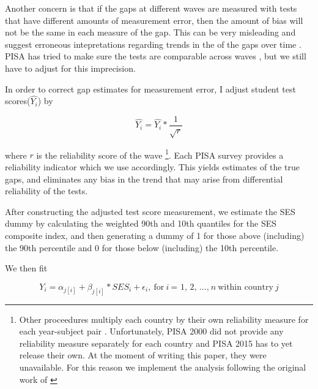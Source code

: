 \documentclass[11pt, a4paper]{article}\usepackage[]{graphicx}\usepackage[]{color}
\begin{document}
Another concern is that if the gaps at different waves are measured with tests that have different amounts of measurement error, then the amount of bias will not be the same in each measure of the gap. This can be very misleading and suggest erroneous intepretations regarding trends in the of the gaps over time \citep{reardon2011}. PISA has tried to make sure the tests are comparable across waves \citep{pisa2012_technical}, but we still have to adjust for this imprecision.

In order to correct gap estimates for measurement error, I adjust student test scores(\begin{math} \hat{Y_i} \end{math}) by

\begin{equation}
\hat{Y_i} = \hat{Y_i} * \frac{1}{\sqrt{r}}
\end{equation}

where \begin{math}r\end{math} is the reliability score of the wave \footnote{Other proceedures multiply each country by their own reliability measure for each year-subject pair \citep{anna2016_global}. Unfortunately, PISA 2000 did not provide any reliability measure separately for each country and PISA 2015 has to yet release their own. At the moment of writing this paper, they were unavailable. For this reason we implement the analysis following the original work of \citet{reardon2011}}. Each PISA survey provides a reliability indicator which we use accordingly. This yields estimates of the true gaps, and eliminates any bias in the trend that may arise from differential reliability of the tests.

After constructing the adjusted test score measurement, we estimate the SES dummy by calculating the weighted 90th and 10th quantiles for the SES composite index, and then generating a dummy of 1 for those above (including) the 90th percentile and 0 for those below (including) the 10th percentile.

We then fit

\begin{equation}
Y_i = \alpha_{j[i]} + \beta_{j[i]} * SES_i + \epsilon_i,\ \text{for} \ i \ \text{= 1, 2, ...,} \ n \ \text{within country} \ j
\end{equation}

\end{document}
